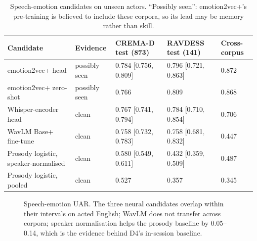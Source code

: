 \begin{table}[!htbp]
\centering\footnotesize
\caption{Speech-emotion candidates on unseen actors. ``Possibly seen'': emotion2vec+'s pre-training
is believed to include these corpora, so its lead may be memory rather than skill.}
\label{tab:ser}
\setlength{\tabcolsep}{5pt}
\begin{tabular}{@{}lllll@{}}
\toprule
Candidate & Evidence & CREMA-D test (873) & RAVDESS test (141) & Cross-corpus \\
\midrule
emotion2vec+ head & possibly seen & 0.784 [0.756, 0.809] & 0.796 [0.721, 0.863] & 0.872 \\
emotion2vec+ zero-shot & possibly seen & 0.766 & 0.809 & 0.868 \\
Whisper-encoder head & clean & 0.767 [0.741, 0.794] & 0.784 [0.710, 0.854] & 0.706 \\
WavLM Base+ fine-tune & clean & 0.758 [0.732, 0.783] & 0.758 [0.681, 0.832] & 0.447 \\
Prosody logistic, speaker-normalised & clean & 0.580 [0.549, 0.611] & 0.432 [0.359, 0.509] & 0.487 \\
Prosody logistic, pooled & clean & 0.527 & 0.357 & 0.345 \\
\bottomrule
\end{tabular}
\end{table}

\begin{figure}[!htbp]
\centering
{}
\caption{Speech-emotion UAR. The three neural candidates overlap within their intervals on acted
English; WavLM does not transfer across corpora; speaker normalisation helps the prosody baseline by
0.05--0.14, which is the evidence behind D4's in-session baseline.}
\label{fig:ser}
\end{figure}

